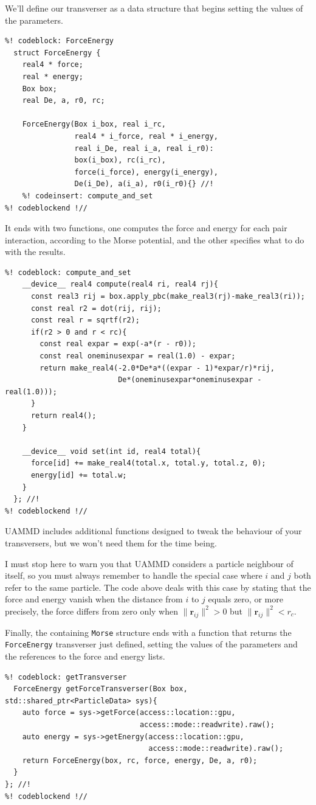 We'll define our transverser as a data structure that begins setting the values
of the parameters.
\begin{lstlisting}
%! codeblock: ForceEnergy
  struct ForceEnergy {
    real4 * force;
    real * energy;
    Box box;
    real De, a, r0, rc;

    ForceEnergy(Box i_box, real i_rc,
                real4 * i_force, real * i_energy,
                real i_De, real i_a, real i_r0):
                box(i_box), rc(i_rc),
                force(i_force), energy(i_energy),
                De(i_De), a(i_a), r0(i_r0){} //!
    %! codeinsert: compute_and_set
%! codeblockend !//
\end{lstlisting}
It ends with two functions, one computes the force and energy for each pair 
interaction, according to the Morse potential, and the other specifies what to 
do with the results.
\begin{lstlisting}
%! codeblock: compute_and_set
    __device__ real4 compute(real4 ri, real4 rj){
      const real3 rij = box.apply_pbc(make_real3(rj)-make_real3(ri));
      const real r2 = dot(rij, rij);
      const real r = sqrtf(r2);
      if(r2 > 0 and r < rc){
        const real expar = exp(-a*(r - r0));
        const real oneminusexpar = real(1.0) - expar;
        return make_real4(-2.0*De*a*((expar - 1)*expar/r)*rij,
                          De*(oneminusexpar*oneminusexpar - real(1.0)));
      }
      return real4();
    }

    __device__ void set(int id, real4 total){
      force[id] += make_real4(total.x, total.y, total.z, 0);
      energy[id] += total.w;
    }
  }; //!
%! codeblockend !//
\end{lstlisting}
UAMMD includes additional functions designed to tweak the behaviour of your 
transversers, but we won't need them for the time being.

I must stop here to warn you that UAMMD considers a particle neighbour of 
itself, so you must always remember to handle the special case where $i$ and $j$ 
both refer to the same particle. The code above deals with this case by stating 
that the force and energy vanish when the distance from $i$ to $j$ equals zero, 
or more precisely, the force differs from zero only when $\|\mathbf{r}_{ij}\|^2 
> 0$ but $\|\mathbf{r}_{ij}\|^2 < r_c$.

Finally, the containing \texttt{Morse} structure ends with a function that 
returns the \texttt{ForceEnergy} transverser just defined, setting the values of 
the parameters and the references to the force and energy lists.
\begin{lstlisting}
%! codeblock: getTransverser
  ForceEnergy getForceTransverser(Box box, std::shared_ptr<ParticleData> sys){
    auto force = sys->getForce(access::location::gpu,
                               access::mode::readwrite).raw();
    auto energy = sys->getEnergy(access::location::gpu,
                                 access::mode::readwrite).raw();
    return ForceEnergy(box, rc, force, energy, De, a, r0);
  }
}; //!
%! codeblockend !//
\end{lstlisting}

